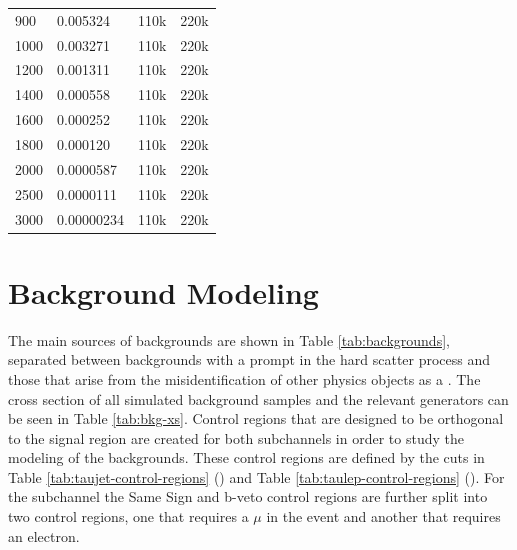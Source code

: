 \begin{table}[!thp]
{\begin{tabular}{| l | l | l | l |}
			900 			& 0.005324 			& 110k 						& 220k							\\
			1000 			& 0.003271 			& 110k 						& 220k							\\
			1200 			& 0.001311 			& 110k 						& 220k							\\
			1400 			& 0.000558 			& 110k 						& 220k							\\
			1600 			& 0.000252 			& 110k 						& 220k							\\
			1800 			& 0.000120 			& 110k 						& 220k							\\
			2000 			& 0.0000587 		& 110k 						& 220k							\\
			2500 			& 0.0000111			& 110k 						& 220k							\\
			3000 			& 0.00000234		& 110k 						& 220k							\\ \hline
			\end{tabular}}
		\end{table}

	\section{Background Modeling}\label{sec:bkg-modeling}
		The main sources of backgrounds are shown in Table \ref{tab:backgrounds}, separated between backgrounds with a prompt \tauhad in the hard scatter process and those that arise from the misidentification of other physics objects as a \tauhad. The cross section of all simulated background samples and the relevant generators can be seen in Table \ref{tab:bkg-xs}. Control regions that are designed to be orthogonal to the signal region are created for both subchannels in order to study the modeling of the backgrounds. These control regions are defined by the cuts in Table \ref{tab:taujet-control-regions} (\taujets) and Table \ref{tab:taulep-control-regions} (\taulep). For the \taulep subchannel the Same Sign and b-veto control regions are further split into two control regions, one that requires a $\mu$ in the event and another that requires an electron. 

		

    \begin{table}[!thp]
      \caption{Dominant backgrounds from prompt \tauhad and fake \tauhad candidates.}
      \label{tab:backgrounds}
      \centering
    \end{table}

